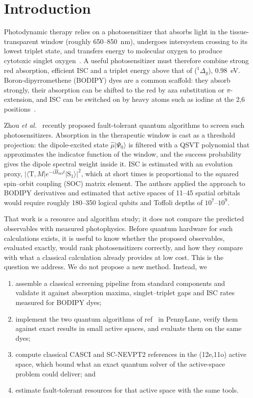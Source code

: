 \documentclass[journal=jpcafh,manuscript=article]{achemso}
\newcommand{\Hso}{\hat H_\mathrm{SO}}
\begin{document}
\section{Introduction}

Photodynamic therapy relies on a photosensitizer that absorbs light in the tissue-transparent
window (roughly 650--850~nm), undergoes intersystem crossing to its lowest triplet state, and
transfers energy to molecular oxygen to produce cytotoxic singlet oxygen~\cite{Agostinis2011}.
A useful photosensitizer must therefore combine strong red absorption, efficient ISC and a triplet
energy above that of ($^1\Delta_g$), 0.98~eV. Boron-dipyrromethene (BODIPY) dyes are a
common scaffold: they absorb strongly, their absorption can be shifted to the red by aza
substitution or $\pi$-extension, and ISC can be switched on by heavy atoms such as iodine at the
2,6 positions~\cite{Loudet2007,Kamkaew2013}.

Zhou \emph{et al.}~\cite{Zhou2025} recently proposed fault-tolerant quantum algorithms to screen
such photosensitizers. Absorption in the therapeutic window is cast as a threshold projection:
the dipole-excited state $\hat\mu\lvert\Psi_0\rangle$ is filtered with a QSVT polynomial that
approximates the indicator function of the window, and the success probability gives the dipole
spectral weight inside it. ISC is estimated with an evolution proxy,
$\lvert\langle \mathrm{T},M\rvert e^{-i\Hso t}\lvert \mathrm{S}_1\rangle\rvert^2$, which at short
times is proportional to the squared spin--orbit coupling (SOC) matrix element. The authors applied
the approach to BODIPY derivatives and estimated that active spaces of 11--45 spatial orbitals would
require roughly 180--350 logical qubits and Toffoli depths of $10^{7}$--$10^{9}$.

That work is a resource and algorithm study; it does not compare the predicted observables with
measured photophysics. Before quantum hardware for such calculations exists, it is useful to know
whether the proposed observables, evaluated exactly, would rank photosensitizers correctly, and how
they compare with what a classical calculation already provides at low cost. This is the question
we address. We do not propose a new method. Instead, we

\begin{enumerate}
  \item assemble a classical screening pipeline from standard components and validate it against
        absorption maxima, singlet--triplet gaps and ISC rates measured for BODIPY dyes;
  \item implement the two quantum algorithms of ref~ in PennyLane, verify them
        against exact results in small active spaces, and evaluate them on the same dyes;
  \item compute classical CASCI and SC-NEVPT2 references in the (12e,11o) active space, which
        bound what an exact quantum solver of the active-space problem could deliver; and
  \item estimate fault-tolerant resources for that active space with the same tools.
\end{enumerate}
\end{document}

